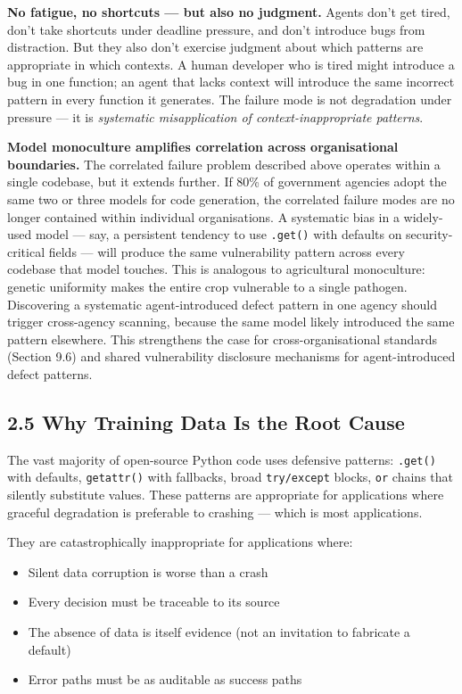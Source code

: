 \documentclass[a4paper,11pt]{report}
\providecommand{\tightlist}{%
  \setlength{\itemsep}{0pt}\setlength{\parskip}{0pt}}
\begin{document}
\textbf{No fatigue, no shortcuts --- but also no judgment.} Agents don't
get tired, don't take shortcuts under deadline pressure, and don't
introduce bugs from distraction. But they also don't exercise judgment
about which patterns are appropriate in which contexts. A human
developer who is tired might introduce a bug in one function; an agent
that lacks context will introduce the same incorrect pattern in every
function it generates. The failure mode is not degradation under
pressure --- it is \emph{systematic misapplication of
context-inappropriate patterns}.

\textbf{Model monoculture amplifies correlation across organisational
boundaries.} The correlated failure problem described above operates
within a single codebase, but it extends further. If 80\% of government
agencies adopt the same two or three models for code generation, the
correlated failure modes are no longer contained within individual
organisations. A systematic bias in a widely-used model --- say, a
persistent tendency to use \texttt{.get()} with defaults on
security-critical fields --- will produce the same vulnerability pattern
across every codebase that model touches. This is analogous to
agricultural monoculture: genetic uniformity makes the entire crop
vulnerable to a single pathogen. Discovering a systematic
agent-introduced defect pattern in one agency should trigger
cross-agency scanning, because the same model likely introduced the same
pattern elsewhere. This strengthens the case for cross-organisational
standards (Section 9.6) and shared vulnerability disclosure mechanisms
for agent-introduced defect patterns.

\hypertarget{why-training-data-is-the-root-cause}{%
\subsection{2.5 Why Training Data Is the Root
Cause}\label{why-training-data-is-the-root-cause}}

The vast majority of open-source Python code uses defensive patterns:
\texttt{.get()} with defaults, \texttt{getattr()} with fallbacks, broad
\texttt{try/except} blocks, \texttt{or} chains that silently substitute
values. These patterns are appropriate for applications where graceful
degradation is preferable to crashing --- which is most applications.

They are catastrophically inappropriate for applications where:

\begin{itemize}
\tightlist
\item
  Silent data corruption is worse than a crash
\item
  Every decision must be traceable to its source
\item
  The absence of data is itself evidence (not an invitation to fabricate
  a default)
\item
  Error paths must be as auditable as success paths
\end{itemize}
\end{document}
